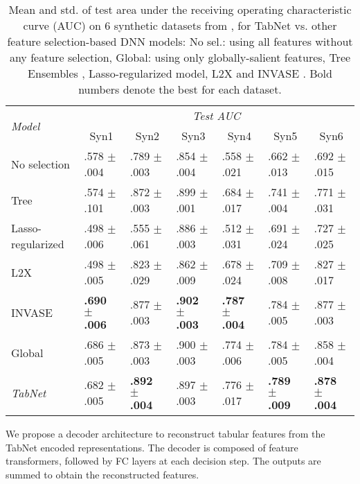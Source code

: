 \begin{table*}[!htbp]
\caption{Mean and std. of test area under the receiving operating characteristic curve (AUC) on 6 synthetic datasets from \citep{l2x}, for TabNet vs. other feature selection-based DNN models: No sel.: using all features without any feature selection, Global: using only globally-salient features, Tree Ensembles \citep{Geurts2006}, Lasso-regularized model, L2X \citep{l2x} and INVASE \citep{invase}. Bold numbers denote the best for each dataset.}
\centering
\begin{tabular}{|l|l|l|l|l|l|l|}
\hline
\multirow{2}{*}{\textit{Model}}& \multicolumn{6}{|c|}{\textit{Test AUC}} \\  \cline{2-7}
& \multicolumn{1}{c|}{Syn1} & \multicolumn{1}{c|}{Syn2} & \multicolumn{1}{c|}{Syn3} & \multicolumn{1}{c|}{Syn4} & \multicolumn{1}{c|}{Syn5} & \multicolumn{1}{c|}{Syn6} \\ \hline
No selection & .578 $\pm$ .004 & .789 $\pm$ .003 & .854 $\pm$ .004 & .558 $\pm$ .021 & .662 $\pm$ .013 & .692 $\pm$ .015 \\ \hline
Tree & .574 $\pm$ .101 & .872 $\pm$ .003 & .899 $\pm$ .001 & .684 $\pm$ .017 & .741 $\pm$ .004 & .771 $\pm$ .031 \\ \hline
Lasso-regularized & .498 $\pm$ .006 & .555 $\pm$ .061 & .886 $\pm$ .003 & .512 $\pm$ .031 & .691 $\pm$ .024 & .727 $\pm$ .025 \\ \hline
L2X & .498 $\pm$ .005 & .823 $\pm$ .029 & .862 $\pm$ .009 & .678 $\pm$ .024 & .709 $\pm$ .008 & .827 $\pm$ .017 \\ \hline
INVASE & \textbf{.690 $\pm$ .006} & .877 $\pm$ .003 & \textbf{.902 $\pm$ .003} & \textbf{.787 $\pm$ .004} & .784 $\pm$ .005 & .877 $\pm$ .003 \\ \hline
Global & .686 $\pm$ .005 & .873 $\pm$ .003 & .900 $\pm$ .003 & .774 $\pm$ .006 & .784 $\pm$ .005 & .858 $\pm$ .004 \\ \hline
\textit{TabNet} & .682 $\pm$ .005 & \textbf{.892 $\pm$ .004} & .897 $\pm$ .003 & .776 $\pm$ .017 & \textbf{.789 $\pm$ .009} & \textbf{.878 $\pm$ .004} \\ \hline
\end{tabular}
\vspace{0cm}
\label{table:feature_selection}
\end{table*}
\vspace{0cm}
\noindent{}
We propose a decoder architecture to reconstruct tabular features from the TabNet encoded representations. The decoder is composed of feature transformers, followed by FC layers at each decision step. The outputs are summed to obtain the reconstructed features.
